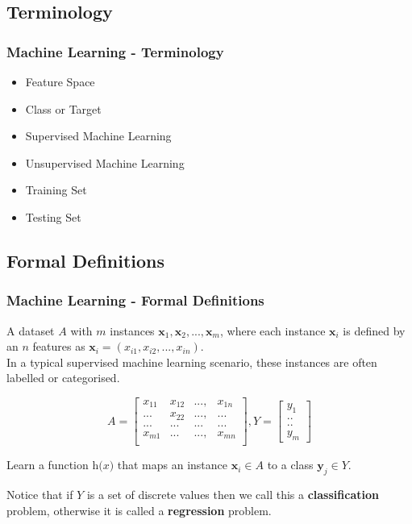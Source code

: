 \documentclass{beamer}\usepackage[]{graphicx}\usepackage[]{color}
\begin{document}
\subsection{Terminology}
\begin{frame}[fragile] \frametitle{Machine Learning - Terminology}

\begin{itemize}
\item Feature Space
\item Class or Target
\item Supervised Machine Learning
\item Unsupervised Machine Learning
\item Training Set
\item Testing Set
\end{itemize}

\end{frame}


\subsection{Formal Definitions}
\begin{frame}[fragile] \frametitle{Machine Learning - Formal Definitions}

A dataset $A$ with $m$ instances $\textbf{x}_{1}, \textbf{x}_{2}, ..., \textbf{x}_{m}$, where each instance $\textbf{x}_{i}$ is defined by an $n$ features as $\textbf {x}_{i}=(x_{i1}, x_{i2}, ..., x_{in})$. \\

In a typical supervised machine learning scenario, these instances are often labelled or categorised. 

\begin{equation} 
\label{eq1}
A = \begin{bmatrix}
 x_{11}  & x_{12}  & ..., & x_{1n}\\ 
...  & x_{22}  & ..., & ...\\ 
...  & ...  & ...& ...\\ 
 
x_{m1}  & ...  & ..., & x_{mn}\\ 
\end{bmatrix},
Y=
\begin{bmatrix}
y_{1}\\ 
..\\ 
..\\ 
y_{m}

\end{bmatrix}
\end{equation}

Learn a function $\textit{h(x)}$ that maps an instance $\textbf{x}_{i} \in A$ to a class $\textbf{y}_{j}\in Y$.

Notice that if $Y$ is a set of discrete values then we call this a \textbf{classification} problem, otherwise it is called a \textbf{regression} problem.

\end{frame}
\end{document}
